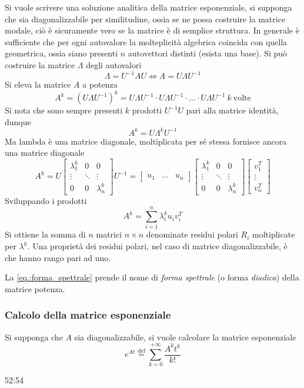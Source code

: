 Si vuole scrivere una soluzione analitica della matrice esponenziale, si
supponga che sia diagonalizzabile per similitudine, ossia se ne possa costruire
la matrice modale, ciò è sicuramente vero se la matrice è di semplice struttura.
In generale è sufficiente che per ogni autovalore la molteplicità
algebrica coincida con quella geometrica, ossia siano presenti $n$ autovettori
distinti (esista una base).
Si può costruire la matrice $\Lambda$ degli autovalori
$$
\Lambda = U^{-1}AU \Leftrightarrow A=U\Lambda U^{-1}
$$
Si eleva la matrice $A$ a potenza
$$
A^k = (U\Lambda U^{-1})^k = U\Lambda U^{-1} \cdot U\Lambda U^{-1} \cdot
\ldots\cdot U\Lambda U^{-1}\ k\ \text{volte}
$$
Si nota che sono sempre presenti $k$ prodotti $U^{-1}U$ pari alla matrice
identità, dunque
$$
A^k = U\Lambda^kU^{-1}
$$
Ma lambda è una matrice diagonale, moltiplicata per sé stessa fornisce ancora
una matrice diagonale
\begin{equation}
A^k = U \begin{bmatrix}
        \lambda_1^k & 0 & 0      \\
        \vdots & \ddots & \vdots \\
        0 & 0 & \lambda_n^k
        \end{bmatrix} U^{-1} =
\begin{bmatrix}u_1 & \ldots & u_n\end{bmatrix} \begin{bmatrix}
        \lambda_1^k & 0 & 0      \\
        \vdots & \ddots & \vdots \\
        0 & 0 & \lambda_n^k
        \end{bmatrix}
        \begin{bmatrix}
        v_1^T\\ \vdots \\ v_n^T
        \end{bmatrix}
\label{eq.:matrice_esponenziale}
\end{equation}
Sviluppando i prodotti
\begin{equation}
A^k = \sum_{i=1}^n \lambda_i^k u_i v_i^T
\label{eq.:forma_spettrale}
\end{equation}
Si ottiene la somma di $n$ matrici $n\times n$ denominate residui
polari $R_i$ moltiplicate per $\lambda^k$.
Una proprietà dei residui polari, nel caso di matrice diagonalizzabile, è che
hanno rango pari ad uno.

La \ref{eq.:forma_spettrale} prende il nome di \textit{forma spettrale} (o
forma \textit{diadica}) della matrice potenza.

\subsubsection{Calcolo della matrice esponenziale}
Si supponga che $A$ sia diagonalizzabile, si vuole calcolare la matrice
esponenziale
$$
e^{At} \stackrel{\text{def}}{=} \sum_{k=0}^{+\infty} \frac{A^kt^k}{k!}
$$

52:54
